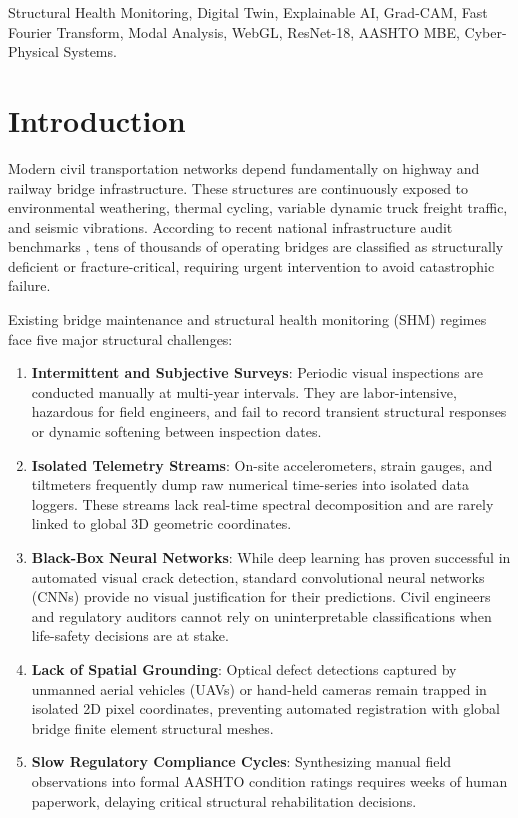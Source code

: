 \documentclass[10pt, conference, letterpaper]{IEEEtran}
\begin{document}
\begin{IEEEkeywords}
Structural Health Monitoring, Digital Twin, Explainable AI, Grad-CAM, Fast Fourier Transform, Modal Analysis, WebGL, ResNet-18, AASHTO MBE, Cyber-Physical Systems.
\end{IEEEkeywords}

\section{Introduction}
Modern civil transportation networks depend fundamentally on highway and railway bridge infrastructure. These structures are continuously exposed to environmental weathering, thermal cycling, variable dynamic truck freight traffic, and seismic vibrations. According to recent national infrastructure audit benchmarks \cite{asce2021}, tens of thousands of operating bridges are classified as structurally deficient or fracture-critical, requiring urgent intervention to avoid catastrophic failure.

Existing bridge maintenance and structural health monitoring (SHM) regimes face five major structural challenges:
\begin{enumerate}
    \item \textbf{Intermittent and Subjective Surveys}: Periodic visual inspections are conducted manually at multi-year intervals. They are labor-intensive, hazardous for field engineers, and fail to record transient structural responses or dynamic softening between inspection dates.
    \item \textbf{Isolated Telemetry Streams}: On-site accelerometers, strain gauges, and tiltmeters frequently dump raw numerical time-series into isolated data loggers. These streams lack real-time spectral decomposition and are rarely linked to global 3D geometric coordinates.
    \item \textbf{Black-Box Neural Networks}: While deep learning has proven successful in automated visual crack detection, standard convolutional neural networks (CNNs) provide no visual justification for their predictions. Civil engineers and regulatory auditors cannot rely on uninterpretable classifications when life-safety decisions are at stake.
    \item \textbf{Lack of Spatial Grounding}: Optical defect detections captured by unmanned aerial vehicles (UAVs) or hand-held cameras remain trapped in isolated 2D pixel coordinates, preventing automated registration with global bridge finite element structural meshes.
    \item \textbf{Slow Regulatory Compliance Cycles}: Synthesizing manual field observations into formal AASHTO condition ratings requires weeks of human paperwork, delaying critical structural rehabilitation decisions.
\end{enumerate}
\end{document}
